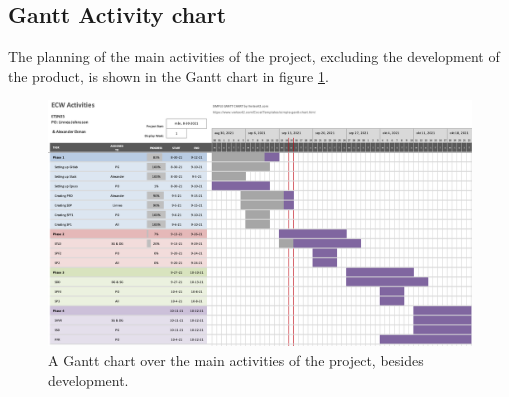 \documentclass{article}
\begin{document}
\subsection{Gantt Activity chart}
The planning of the main activities of the project, excluding the development of the product, is shown in the Gantt chart in figure \ref{fig:GantAct}.
\begin{figure}[H]
    \centering
    \includegraphics[scale=0.7, angle=90]{sdpFigures/GantActi.png}
    \caption{A Gantt chart over the main activities of the project, besides development.}
    \label{fig:GantAct}
\end{figure}
\end{document}
